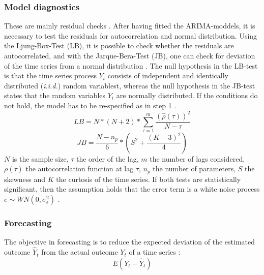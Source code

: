 \documentclass[a4paper, 11pt]{article}
\begin{document}
\subsubsection{Model diagnostics}
These are mainly residual checks \citep{Arlt.2017}. After having fitted the ARIMA-moddels, it is necessary to test the residuals for autocorrelation and normal distribution. Using the Ljung-Box-Test (LB), it is possible to check whether the residuals are autocorrelated, and with the Jarque-Bera-Test (JB), one can check for deviation of the time series from a normal distribution  \citep{Andreoni.2006b}. The null hypothesis in the LB-test is that the time series process $Y_{t}$ consists of independent and identically distributed (\textit{i.i.d.}) random variablest, whereas the null hypothesis in the JB-test states that the random variables $Y_{t}$ are normally distributed. If the conditions do not hold, the model has to be re-specified as in step 1 \citep{Vogel.2015}. \\
\begin{equation}
	LB = N *(N + 2) * \sum_{\tau = 1}^{m}\frac{(\hat{\rho}(\tau))^2}{N - \tau}
\end{equation}
\begin{equation}
	JB = \frac{N - n_{p}}{6}*(S^2 + \frac{(K - 3)^2}{4})
\end{equation}
$N$ is the sample size, $\tau$ the order of the lag, $m$ the number of lags considered, $\rho(\tau)$ the autocorrelation function at lag $\tau$, $n_{p}$ the number of parameters, $S$ the skewness and $K$ the curtosis of the time series. If both tests are statistically significant, then the assumption holds that the error term is a white noise process $e \sim  WN(0, \sigma_{\epsilon}^2)$ \citep{Intihar.2017}.\\

\subsubsection{Forecasting}
The objective in forecasting is to reduce the expected deviation of the estimated outcome $\hat{Y}_{t}$ from the actual outcome $Y_{t}$ of a time series \citep{Falk.2012}:
\begin{equation}
	E(Y_{t} - \hat{Y}_{t})
\end{equation}
\end{document}
